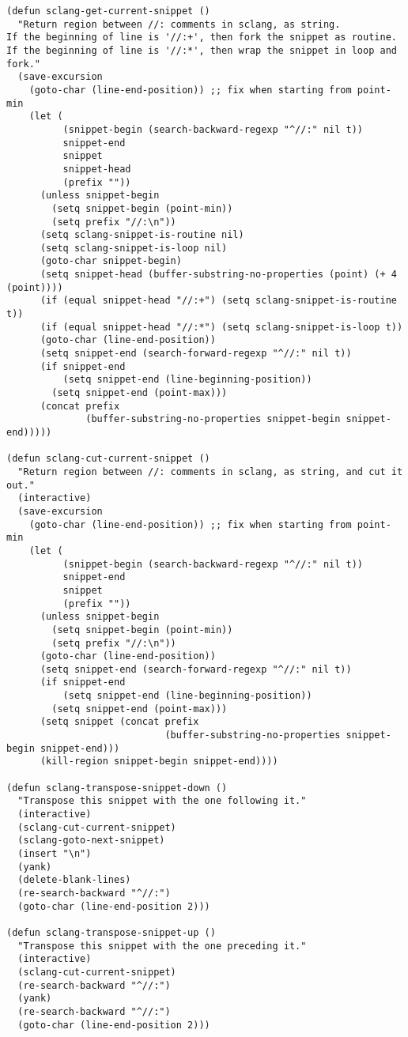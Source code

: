 \documentclass[11pt]{article}
\begin{document}
\begin{verbatim}
(defun sclang-get-current-snippet ()
  "Return region between //: comments in sclang, as string.
If the beginning of line is '//:+', then fork the snippet as routine.
If the beginning of line is '//:*', then wrap the snippet in loop and fork."
  (save-excursion
    (goto-char (line-end-position)) ;; fix when starting from point-min
    (let (
          (snippet-begin (search-backward-regexp "^//:" nil t))
          snippet-end
          snippet
          snippet-head
          (prefix ""))
      (unless snippet-begin
        (setq snippet-begin (point-min))
        (setq prefix "//:\n"))
      (setq sclang-snippet-is-routine nil)
      (setq sclang-snippet-is-loop nil)
      (goto-char snippet-begin)
      (setq snippet-head (buffer-substring-no-properties (point) (+ 4 (point))))
      (if (equal snippet-head "//:+") (setq sclang-snippet-is-routine t))
      (if (equal snippet-head "//:*") (setq sclang-snippet-is-loop t))
      (goto-char (line-end-position))
      (setq snippet-end (search-forward-regexp "^//:" nil t))
      (if snippet-end
          (setq snippet-end (line-beginning-position))
        (setq snippet-end (point-max)))
      (concat prefix
              (buffer-substring-no-properties snippet-begin snippet-end)))))

(defun sclang-cut-current-snippet ()
  "Return region between //: comments in sclang, as string, and cut it out."
  (interactive)
  (save-excursion
    (goto-char (line-end-position)) ;; fix when starting from point-min
    (let (
          (snippet-begin (search-backward-regexp "^//:" nil t))
          snippet-end
          snippet
          (prefix ""))
      (unless snippet-begin
        (setq snippet-begin (point-min))
        (setq prefix "//:\n"))
      (goto-char (line-end-position))
      (setq snippet-end (search-forward-regexp "^//:" nil t))
      (if snippet-end
          (setq snippet-end (line-beginning-position))
        (setq snippet-end (point-max)))
      (setq snippet (concat prefix
                            (buffer-substring-no-properties snippet-begin snippet-end)))
      (kill-region snippet-begin snippet-end))))

(defun sclang-transpose-snippet-down ()
  "Transpose this snippet with the one following it."
  (interactive)
  (sclang-cut-current-snippet)
  (sclang-goto-next-snippet)
  (insert "\n")
  (yank)
  (delete-blank-lines)
  (re-search-backward "^//:")
  (goto-char (line-end-position 2)))

(defun sclang-transpose-snippet-up ()
  "Transpose this snippet with the one preceding it."
  (interactive)
  (sclang-cut-current-snippet)
  (re-search-backward "^//:")
  (yank)
  (re-search-backward "^//:")
  (goto-char (line-end-position 2)))


\end{verbatim}
\end{document}
